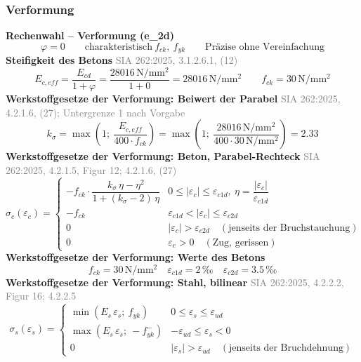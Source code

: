 \documentclass[11pt,a4paper]{article}
\newcommand{\normref}[1]{{\small\textcolor{gray}{#1}}}
\begin{document}
\subsubsection{Verformung}
\noindent\textbf{Rechenwahl – Verformung (e\_2d)}
\begin{equation*}
\varphi = 0 \qquad \text{charakteristisch}\ f_{ck},\ f_{yk} \qquad \text{Präzise ohne Vereinfachung}
\end{equation*}
\noindent\textbf{Steifigkeit des Betons} \hfill \normref{SIA 262:2025, 3.1.2.6.1, (12)}
\begin{equation*}
E_{c,eff} = \frac{E_{cd}}{1 + \varphi} = \frac{28016\,\mathrm{N}/\mathrm{mm}^{2}}{1 + 0} = 28016\,\mathrm{N}/\mathrm{mm}^{2} \qquad f_{ck} = 30\,\mathrm{N}/\mathrm{mm}^{2}
\end{equation*}
\noindent\textbf{Werkstoffgesetze der Verformung: Beiwert der Parabel} \hfill \normref{SIA 262:2025, 4.2.1.6, (27); Untergrenze 1 nach Vorgabe}
\begin{equation*}
k_{\sigma} = \max\left(1;\ \frac{E_{c,eff}}{400 \cdot f_{ck}}\right) = \max\left(1;\ \frac{28016\,\mathrm{N}/\mathrm{mm}^{2}}{400 \cdot 30\,\mathrm{N}/\mathrm{mm}^{2}}\right) = 2.33
\end{equation*}
\noindent\textbf{Werkstoffgesetze der Verformung: Beton, Parabel-Rechteck} \hfill \normref{SIA 262:2025, 4.2.1.5, Figur 12; 4.2.1.6, (27)}
\begin{equation*}
\sigma_c(\varepsilon_c) = \begin{cases} -f_{ck} \cdot \dfrac{k_\sigma\,\eta - \eta^2}{1 + (k_\sigma - 2)\,\eta} & 0 \le |\varepsilon_c| \le \varepsilon_{c1d},\ \eta = \dfrac{|\varepsilon_c|}{\varepsilon_{c1d}} \\[2ex] -f_{ck} & \varepsilon_{c1d} < |\varepsilon_c| \le \varepsilon_{c2d} \\[1ex] 0 & |\varepsilon_c| > \varepsilon_{c2d} \quad (\text{jenseits der Bruchstauchung}) \\[1ex] 0 & \varepsilon_c > 0 \quad (\text{Zug, gerissen}) \end{cases}
\end{equation*}
\noindent\textbf{Werkstoffgesetze der Verformung: Werte des Betons}
\begin{equation*}
f_{ck} = 30\,\mathrm{N}/\mathrm{mm}^{2} \quad \varepsilon_{c1d} = 2\,\text{‰} \quad \varepsilon_{c2d} = 3.5\,\text{‰}
\end{equation*}
\noindent\textbf{Werkstoffgesetze der Verformung: Stahl, bilinear} \hfill \normref{SIA 262:2025, 4.2.2.2, Figur 16; 4.2.2.5}
\begin{equation*}
\sigma_s(\varepsilon_s) = \begin{cases} \min(E_s\,\varepsilon_s;\ f_{yk}) & 0 \le \varepsilon_s \le \varepsilon_{ud} \\[1ex] \max(E_s\,\varepsilon_s;\ -f_{yk}^{-}) & -\varepsilon_{ud} \le \varepsilon_s < 0 \\[1ex] 0 & |\varepsilon_s| > \varepsilon_{ud} \quad (\text{jenseits der Bruchdehnung}) \end{cases}
\end{equation*}
\end{document}
